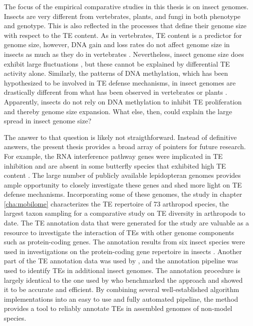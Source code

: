 The focus of the empirical comparative studies in this thesis is on
insect genomes. Insects are very different from vertebrates, plants,
and fungi in both phenotype and genotype. This is also reflected in the
processes that define their genome size with respect to the TE content.
As in vertebrates, TE content is a predictor for genome size, however,
DNA gain and loss rates do not affect genome size in insects as much as
they do in vertebrates \citep{Kapusta2017a, Lindblad-Toh2005}.
Nevertheless, insect genome size does exhibit large fluctuations
\citep{Alfsnes2017}, but these cannot be explained by differential TE
activity alone.  Similarly, the patterns of DNA methylation, which has
been hypothesized to be involved in TE defense mechanisms, in insect
genomes are drastically different from what has been observed in
vertebrates or plants \citep{Provataris2018, Suzuki2008}. Apparently,
insects do not rely on DNA methylation to inhibit TE proliferation and
thereby genome size expansion. What else, then, could explain the large
spread in insect genome size?

The answer to that question is likely not straigthforward. Instead of
definitive answers, the present thesis provides a broad array of
pointers for future research. For example, the RNA interference pathway
genes were implicated in TE inhibition \citep{Aravin2001, Czech2008} and
are absent in some butterfly species that exhibited high TE content
\citep{Dowling2017}. The large number of publicly available lepidopteran
genomes provides ample opportunity to closely investigate these genes
and shed more light on TE defense mechanisms. Incorporating some of
these genomes, the study in chapter \ref{cha:mobilome} characterizes the
TE repertoire of 73 arthropod species, the largest taxon sampling for a
comparative study on TE diversity in arthropods to date. The TE
annotation data that were generated for the study are valuable as a
resource to investigate the interaction of TEs with other genome
components such as protein-coding genes. The annotation results from six
insect species  were used in
investigations on the protein-coding gene repertoire in insects
. Another part of the TE annotation data was
used by \citep{Provataris2018}, and the annotation pipeline was used to
identify TEs in additional insect genomes. The annotation procedure is
largely identical to the one used by \citet{Reinar2016} who benchmarked
the approach and showed it to be accurate and efficient. By combining
several well-established algorithm implementations into an easy to use
and fully automated pipeline, the method provides a tool to reliably
annotate TEs in assembled genomes of non-model species. 

